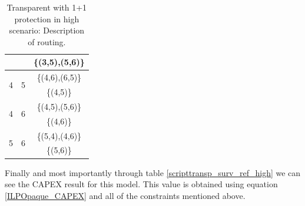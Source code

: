 \begin{table}[h!]
\begin{tabular}{|| c | c | c ||}
 & & \{(3,5),(5,6)\} \\ \hline
 \multirow{2}{*}{4} & \multirow{2}{*}{5} & \{(4,6),(6,5)\} \\
 & & \{(4,5)\} \\ \hline
 \multirow{2}{*}{4} & \multirow{2}{*}{6} & \{(4,5),(5,6)\} \\
 & & \{(4,6)\} \\ \hline
 \multirow{2}{*}{5} & \multirow{2}{*}{6} & \{(5,4),(4,6)\} \\
 & & \{(5,6)\} \\
 \hline
\end{tabular}
\caption{Transparent with 1+1 protection in high scenario: Description of routing.}
\label{path_transp_protec_ref_high}
\end{table}

Finally and most importantly through table \ref{scripttransp_surv_ref_high} we can see the CAPEX result for this model. This value is obtained using equation \ref{ILPOpaque_CAPEX} and all of the constraints mentioned above.\\
\newpage
